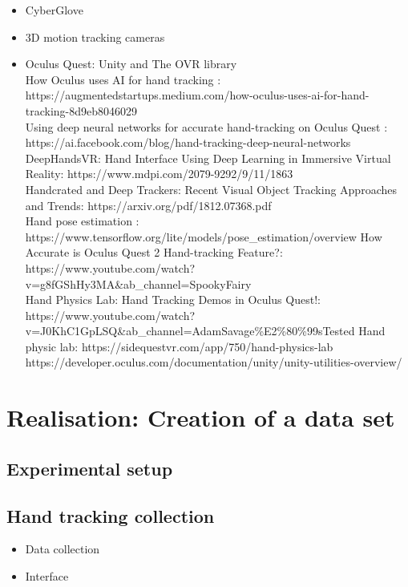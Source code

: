 \documentclass{article}
\begin{document}
\begin{itemize}
    \item CyberGlove
    \item 3D motion tracking cameras
    \item Oculus Quest: Unity and The OVR library \\
    How Oculus uses AI for hand tracking : https://augmentedstartups.medium.com/how-oculus-uses-ai-for-hand-tracking-8d9eb8046029 \\
    Using deep neural networks for accurate hand-tracking on Oculus Quest : https://ai.facebook.com/blog/hand-tracking-deep-neural-networks \\
    DeepHandsVR: Hand Interface Using Deep Learning in Immersive Virtual Reality: https://www.mdpi.com/2079-9292/9/11/1863 \\
    Handcrated and Deep Trackers: Recent Visual Object Tracking Approaches and Trends: https://arxiv.org/pdf/1812.07368.pdf \\
    Hand pose estimation : https://www.tensorflow.org/lite/models/pose\_estimation/overview
    How Accurate is Oculus Quest 2 Hand-tracking Feature?: https://www.youtube.com/watch?v=g8fGShHy3MA&ab\_channel=SpookyFairy  \\
    Hand Physics Lab: Hand Tracking Demos in Oculus Quest!: https://www.youtube.com/watch?v=J0KhC1GpLSQ&ab\_channel=AdamSavage\%E2\%80\%99sTested 
    Hand physic lab: https://sidequestvr.com/app/750/hand-physics-lab \\
    https://developer.oculus.com/documentation/unity/unity-utilities-overview/
\end{itemize}


\section{Realisation: Creation of a data set}

\subsection{Experimental setup}

\subsection{Hand tracking collection}

\begin{itemize}
    \item Data collection
    \item Interface
\end{itemize}
\end{document}
